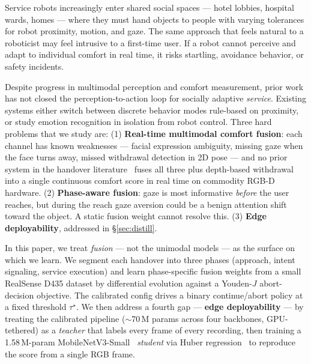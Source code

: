 \documentclass{article}
\begin{document}
Service robots increasingly enter shared social spaces --- hotel lobbies, hospital wards, homes --- where they must hand objects to people with varying tolerances for robot proximity, motion, and gaze. The same approach that feels natural to a roboticist may feel intrusive to a first-time user. If a robot cannot perceive and adapt to individual comfort in real time, it risks startling, avoidance behavior, or safety incidents.

Despite progress in multimodal perception and comfort measurement, prior work has not closed the perception-to-action loop for socially adaptive \emph{service}. Existing systems either switch between discrete behavior modes rule-based on proximity, or study emotion recognition in isolation from robot control. Three hard problems that we study are: (1) \textbf{Real-time multimodal comfort fusion}: each channel has known weaknesses --- facial expression ambiguity, missing gaze when the face turns away, missed withdrawal detection in 2D pose --- and no prior system in the handover literature~\cite{strabala2013,ortenzi2021} fuses all three plus depth-based withdrawal into a single continuous comfort score in real time on commodity RGB-D hardware. (2) \textbf{Phase-aware fusion}: gaze is most informative \emph{before} the user reaches, but during the reach gaze aversion could be a benign attention shift toward the object. A static fusion weight cannot resolve this. (3) \textbf{Edge deployability}, addressed in \S\ref{sec:distill}.

In this paper, we treat \emph{fusion} --- not the unimodal models --- as the surface on which we learn. We segment each handover into three phases (approach, intent signaling, service execution) and learn phase-specific fusion weights from a small RealSense D435 dataset by differential evolution against a Youden-$J$ abort-decision objective. The calibrated config drives a binary continue/abort policy at a fixed threshold $\tau^\star$. We then address a fourth gap --- \textbf{edge deployability} --- by treating the calibrated pipeline ($\sim$70\,M params across four backbones, GPU-tethered) as a \emph{teacher} that labels every frame of every recording, then training a 1.58\,M-param MobileNetV3-Small~\cite{mobilenetv3} \emph{student} via Huber regression~\cite{distillation} to reproduce the score from a single RGB frame.
\end{document}
